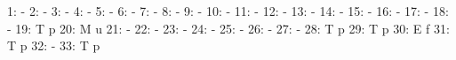 \documentclass[nojss]{jss}
\begin{document}
\begin{Schunk}
\begin{Soutput}
  1:                                                                          -
  2:                                                                          -
  3:                                                                          -
  4:                                                                          -
  5:                                                                          -
  6:                                                                          -
  7:                                                                          -
  8:                                                                          -
  9:                                                                          -
 10:                                                                          -
 11:                                                                          -
 12:                                                                          -
 13:                                                                          -
 14:                                                                          -
 15:                                                                          -
 16:                                                                          -
 17:                                                                          -
 18:                                                                          -
 19:                                          T                               p
 20:                                          M                               u
 21:                                                                          -
 22:                                                                          -
 23:                                                                          -
 24:                                                                          -
 25:                                                                          -
 26:                                                                          -
 27:                                                                          -
 28:                                          T                               p
 29:                                          T                               p
 30:                                          E                               f
 31:                                          T                               p
 32:                                                                          -
 33:                                          T                               p

\end{Soutput}
\end{Schunk}
\end{document}
